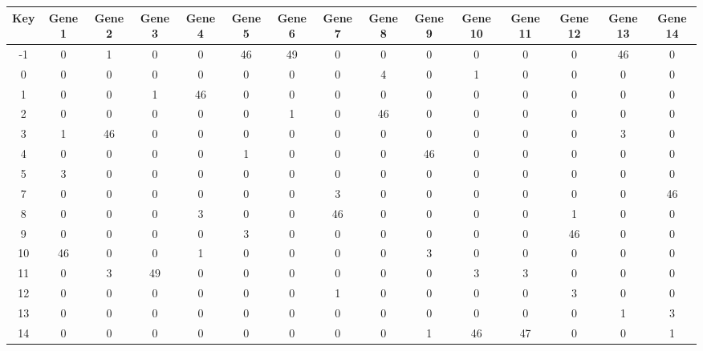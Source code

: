 \begin{tabular}{|c|c|c|c|c|c|c|c|c|c|c|c|c|c|c|}
\hline
Key & Gene 1 & Gene 2 & Gene 3 & Gene 4 & Gene 5 & Gene 6 & Gene 7 & Gene 8 & Gene 9 & Gene 10 & Gene 11 & Gene 12 & Gene 13 & Gene 14 \\
\hline
-1 & 0 & 1 & 0 & 0 & 46 & 49 & 0 & 0 & 0 & 0 & 0 & 0 & 46 & 0 \\
0 & 0 & 0 & 0 & 0 & 0 & 0 & 0 & 4 & 0 & 1 & 0 & 0 & 0 & 0 \\
1 & 0 & 0 & 1 & 46 & 0 & 0 & 0 & 0 & 0 & 0 & 0 & 0 & 0 & 0 \\
2 & 0 & 0 & 0 & 0 & 0 & 1 & 0 & 46 & 0 & 0 & 0 & 0 & 0 & 0 \\
3 & 1 & 46 & 0 & 0 & 0 & 0 & 0 & 0 & 0 & 0 & 0 & 0 & 3 & 0 \\
4 & 0 & 0 & 0 & 0 & 1 & 0 & 0 & 0 & 46 & 0 & 0 & 0 & 0 & 0 \\
5 & 3 & 0 & 0 & 0 & 0 & 0 & 0 & 0 & 0 & 0 & 0 & 0 & 0 & 0 \\
7 & 0 & 0 & 0 & 0 & 0 & 0 & 3 & 0 & 0 & 0 & 0 & 0 & 0 & 46 \\
8 & 0 & 0 & 0 & 3 & 0 & 0 & 46 & 0 & 0 & 0 & 0 & 1 & 0 & 0 \\
9 & 0 & 0 & 0 & 0 & 3 & 0 & 0 & 0 & 0 & 0 & 0 & 46 & 0 & 0 \\
10 & 46 & 0 & 0 & 1 & 0 & 0 & 0 & 0 & 3 & 0 & 0 & 0 & 0 & 0 \\
11 & 0 & 3 & 49 & 0 & 0 & 0 & 0 & 0 & 0 & 3 & 3 & 0 & 0 & 0 \\
12 & 0 & 0 & 0 & 0 & 0 & 0 & 1 & 0 & 0 & 0 & 0 & 3 & 0 & 0 \\
13 & 0 & 0 & 0 & 0 & 0 & 0 & 0 & 0 & 0 & 0 & 0 & 0 & 1 & 3 \\
14 & 0 & 0 & 0 & 0 & 0 & 0 & 0 & 0 & 1 & 46 & 47 & 0 & 0 & 1 \\
\hline
\end{tabular}